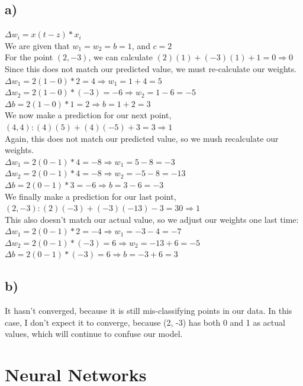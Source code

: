 \documentclass[12pt, letterpaper]{article}
\begin{document}
\subsection*{a)} $\Delta w_i=x(t-z)*x_i$\\
We are given that $w_1 = w_2 = b = 1$, and $c=2$\\
For the point $(2,-3)$, we can calculate $(2)(1)+(-3)(1)+1 = 0 \Rightarrow 0$\\
Since this does not match our predicted value, we must re-calculate our weights.\\
$\Delta w_1 = 2(1-0)*2 = 4 \Rightarrow w_1 = 1 + 4 = 5$\\
$\Delta w_2 = 2(1-0)*(-3) = -6 \Rightarrow w_2 = 1 - 6 = -5$\\
$\Delta b = 2(1-0)*1 = 2 \Rightarrow b = 1 + 2 = 3$\\
We now make a prediction for our next point, $(4, 4): (4)(5)+(4)(-5)+3 = 3 \Rightarrow 1$\\
Again, this does not match our predicted value, so we mush recalculate our weights.\\
$\Delta w_1 = 2(0-1)*4 = -8 \Rightarrow w_1 = 5 - 8 = -3$\\
$\Delta w_2 = 2(0-1)*4 = -8 \Rightarrow w_2 = -5 - 8 = -13$\\
$\Delta b = 2(0-1)*3 = -6 \Rightarrow b = 3 - 6 = -3$\\
We finally make a prediction for our last point, $(2, -3): (2)(-3)+(-3)(-13)-3 = 30 \Rightarrow 1$\\
This also doesn't match our actual value, so we adjust our weights one last time:\\
$\Delta w_1 = 2(0-1)*2 = -4 \Rightarrow w_1 = -3 - 4 = -7$\\
$\Delta w_2 = 2(0-1)*(-3) = 6 \Rightarrow w_2 = -13 + 6 = -5$\\
$\Delta b = 2(0-1)*(-3) = 6 \Rightarrow b = -3 + 6 = 3$\\

\subsection*{b)} It hasn't converged, because it is still mis-classifying points in our data. In this case, I don't expect it to converge, because (2, -3) has both 0 and 1 as actual values, which will continue to confuse our model.

\newpage
\section{ Neural Networks}
\end{document}
